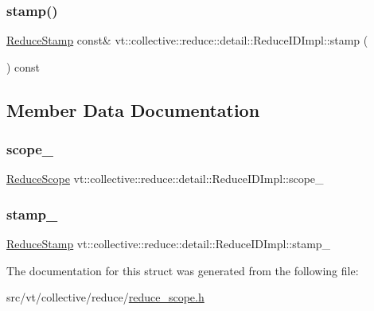 \subsubsection{\texorpdfstring{stamp()}{stamp()}}
{\footnotesize\ttfamily \hyperlink{namespacevt_1_1collective_1_1reduce_1_1detail_abcd205dec83706f347d55c7528bf2664}{Reduce\+Stamp} const\& vt\+::collective\+::reduce\+::detail\+::\+Reduce\+I\+D\+Impl\+::stamp (\begin{DoxyParamCaption}{ }\end{DoxyParamCaption}) const\hspace{0.3cm}{\ttfamily [inline]}}



\subsection{Member Data Documentation}
\mbox{\label{structvt_1_1collective_1_1reduce_1_1detail_1_1_reduce_i_d_impl_afc9cc556d4e84fe7c41944102a926d59}} 
\subsubsection{\texorpdfstring{scope\+\_\+}{scope\_}}
{\footnotesize\ttfamily \hyperlink{structvt_1_1collective_1_1reduce_1_1detail_1_1_reduce_scope}{Reduce\+Scope} vt\+::collective\+::reduce\+::detail\+::\+Reduce\+I\+D\+Impl\+::scope\+\_\+\hspace{0.3cm}{\ttfamily [protected]}}

\mbox{\label{structvt_1_1collective_1_1reduce_1_1detail_1_1_reduce_i_d_impl_a84804f019298c0321847c09749ced0bb}} 
\subsubsection{\texorpdfstring{stamp\+\_\+}{stamp\_}}
{\footnotesize\ttfamily \hyperlink{namespacevt_1_1collective_1_1reduce_1_1detail_abcd205dec83706f347d55c7528bf2664}{Reduce\+Stamp} vt\+::collective\+::reduce\+::detail\+::\+Reduce\+I\+D\+Impl\+::stamp\+\_\+\hspace{0.3cm}{\ttfamily [protected]}}



The documentation for this struct was generated from the following file\+:\begin{DoxyCompactItemize}
\item 
src/vt/collective/reduce/\hyperlink{reduce__scope_8h}{reduce\+\_\+scope.\+h}\end{DoxyCompactItemize}
